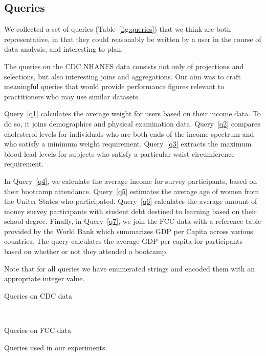 \subsection{Queries}
We collected a set of queries (Table~\ref{fig:queries}) that we think are both representative, in that they could reasonably be written by a user in the course of data analysis, and interesting to plan.

The queries on the CDC NHANES data consists not only of projections and selections,
but also interesting joins and aggregations. Our aim was to craft meaningful queries
that would provide performance figures relevant to practitioners who may use
similar datasets.

Query~\ref{q1} calculates the average weight for users based on their income data.
To do so, it joins demographics and physical examination data. Query~\ref{q2}
compares cholesterol levels for individuals who are both ends of the income
spectrum and who satisfy a minimum weight requirement. Query~\ref{q3}
extracts the maximum blood lead levels for subjects who satisfy a particular
waist circumference requirement.

In Query~\ref{q4}, we calculate the average income for survey participants,
based on their bootcamp attendance. Query~\ref{q5} estimates the average
age of women from the Uniter States who participated. Query~\ref{q6} 
calculates the average amount of money survey participants with student debt destined to
learning based on their school degree. Finally, in Query~\ref{q7}, we join the FCC data with a reference table provided
by the World Bank which summarizes GDP per Capita across various
countries\cite{worldbank-data}. The query calculates the average GDP-per-capita for participants based on whether or not they
attended a bootcamp. 

Note that for all queries we have enumerated strings and encoded them with
an appropriate integer value.

\begin{table*}
\centering
 \begin{subtable}{\linewidth}
  
  \caption{Queries on CDC data}
  \label{fig:queries-cdc}
 \end{subtable}
 ~
 \begin{subtable}{\linewidth}
 
 \caption{Queries on FCC data}
 \label{fig:queries-fcc}
 \end{subtable}
  \caption{Queries used in our experiments.}
  \label{fig:queries}
\end{table*}

